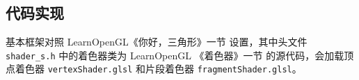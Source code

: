 \documentclass[math-font=newcm]{sjtuarticle}
\providecommand{\code}[2]{}
\begin{document}
\subsection{代码实现}

基本框架对照 LearnOpenGL《你好，三角形》一节\cite{hellotri} 设置，其中头文件 \verb"shader_s.h" 中的着色器类为 LearnOpenGL 《着色器》一节\cite{shaders} 的源代码\cite{shadersrc}，会加载顶点着色器 \verb"vertexShader.glsl" 和片段着色器 \verb"fragmentShader.glsl"。

\code{../source/src/main.cpp}{c++}

\code{../source/assets/shader/vertexShader.glsl}{c}

\code{../source/assets/shader/fragmentShader.glsl}{c}

\printbibliography[heading=bibintoc]

\appendix



\end{document}
